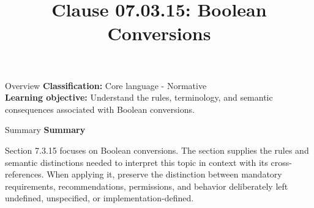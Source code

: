 \documentclass[10pt,letterpaper]{article}
\title{Clause 07.03.15: Boolean Conversions}
\author{}
\date{}
\begin{document}
\maketitle
\begin{CornellOverviewBox}{Overview}
\textbf{Classification:} Core language - Normative\\[2pt]
\textbf{Learning objective:} Understand the rules, terminology, and semantic consequences associated with Boolean conversions.
\end{CornellOverviewBox}\begin{CornellSummaryBox}{Summary}
{\sffamily\bfseries\color{Accent} Summary}\par\vspace{3pt}Section 7.3.15 focuses on Boolean conversions. The section supplies the rules and semantic distinctions needed to interpret this topic in context with its cross-references. When applying it, preserve the distinction between mandatory requirements, recommendations, permissions, and behavior deliberately left undefined, unspecified, or implementation-defined.
\end{CornellSummaryBox}
\end{document}
